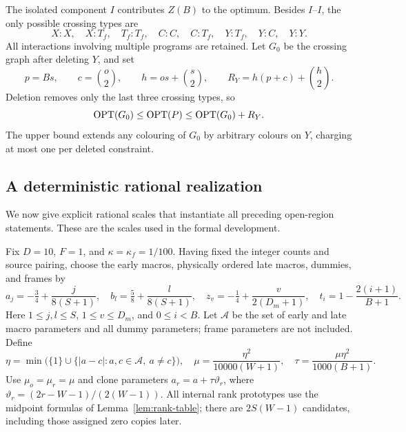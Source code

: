 The isolated component $I$ contributes $Z(B)$ to the optimum. Besides $I$--$I$, the only possible crossing types are
\[
X\!:\!X,\quad X\!:\!T_f,\quad T_f\!:\!T_f,\quad
C\!:\!C,\quad C\!:\!T_f,\quad Y\!:\!T_f,\quad Y\!:\!C,\quad Y\!:\!Y.
\]
All interactions involving multiple programs are retained. Let $G_0$ be the crossing graph after deleting $Y$, and set
\begin{equation}\label{eq:nonfan-budget}
p=Bs,\qquad c=\binom o2,\qquad h=os+\binom s2,\qquad
R_Y=h(p+c)+\binom h2.
\end{equation}
Deletion removes only the last three crossing types, so
\begin{equation}\label{eq:nonfan-delete}
\operatorname{OPT}(G_0)\leq\operatorname{OPT}(P)\leq\operatorname{OPT}(G_0)+R_Y.
\end{equation}
The upper bound extends any colouring of $G_0$ by arbitrary colours on $Y$, charging at most one per deleted constraint.

\subsection{A deterministic rational realization}\label{subsec:realization}
We now give explicit rational scales that instantiate all preceding open-region statements. These are the scales used in the formal development.

Fix $D=10$, $F=1$, and $\kappa=\kappa_f=1/100$. Having fixed the integer counts and source pairing, choose the early macros, physically ordered late macros, dummies, and frames by
\begin{equation}\label{eq:base-parameters}
a_j=-\tfrac34+\frac{j}{8(S+1)},\quad
b_l=\tfrac58+\frac{l}{8(S+1)},\quad
z_v=-\tfrac14+\frac{v}{2(D_m+1)},\quad
t_i=1-\frac{2(i+1)}{B+1}.
\end{equation}
Here $1\leq j,l\leq S$, $1\leq v\leq D_m$, and $0\leq i<B$. Let $\mathcal A$ be the set of early and late macro parameters and all dummy parameters; frame parameters are not included. Define
\begin{equation}\label{eq:explicit-scales}
\eta=\min\bigl(\{1\}\cup\{|a-c|:a,c\in\mathcal A,\ a\ne c\}\bigr),\quad
\mu=\frac{\eta^2}{10000(W+1)},\quad
\tau=\frac{\mu\eta^2}{1000(B+1)}.
\end{equation}
Use $\mu_o=\mu_r=\mu$ and clone parameters
$a_r=a+\tau\vartheta_r$, where $\vartheta_r=(2r-W-1)/(2(W-1))$.
All internal rank prototypes use the midpoint formulas of Lemma~\ref{lem:rank-table}; there are $2S(W-1)$ candidates, including those assigned zero copies later.

